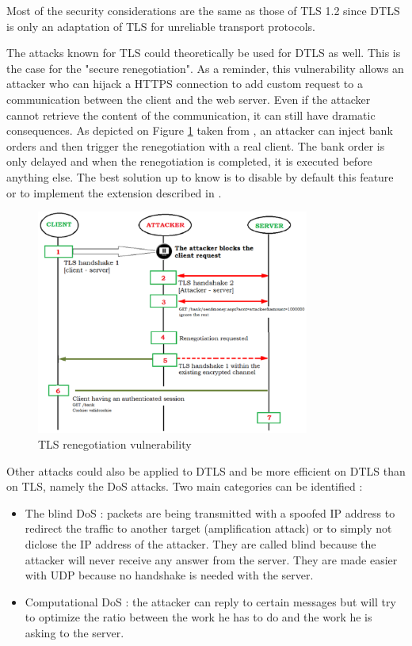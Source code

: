 Most of the security considerations are the same as those of TLS 1.2 \cite{RFC5246} since DTLS is only an adaptation of TLS for unreliable transport protocols.

The attacks known for TLS could theoretically be used for DTLS as well. This is the case for the "secure renegotiation". As a reminder, this vulnerability allows an attacker who can hijack a HTTPS connection to add custom request to a communication between the client and the web server. Even if the attacker cannot retrieve the content of the communication, it can still have dramatic consequences. As depicted on Figure \ref{fig:tls-reneg} taken from \cite{tls-reneg}, an attacker can inject bank orders and then trigger the renegotiation with a real client. The bank order is only delayed and when the renegotiation is completed, it is executed before anything else. The best solution up to know is to disable by default this feature or to implement the extension described in \cite{rfc5746}.

\begin{figure}[!ht]
\centering
\includegraphics[width=0.8\textwidth]{images/TLSrenegotiation}
\caption{TLS renegotiation vulnerability}
\label{fig:tls-reneg}
\end{figure}

Other attacks could also be applied to DTLS and be more efficient on DTLS than on TLS, namely the DoS attacks. Two main categories can be identified :

\begin{itemize}
\item The blind DoS : packets are being transmitted with a spoofed IP address to redirect the traffic to another target (amplification attack) or to simply not diclose the IP address of the attacker. They are called blind because the attacker will never receive any answer from the server. They are made easier with UDP because no handshake is needed with the server.
\item Computational DoS : the attacker can reply to certain messages but will try to optimize the ratio between the work he has to do and the work he is asking to the server.
\end{itemize}

